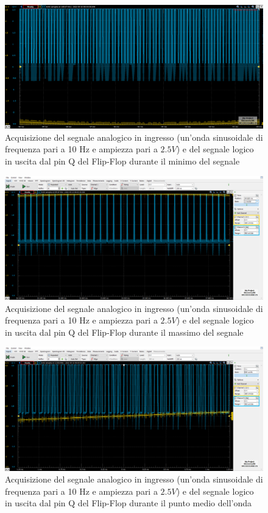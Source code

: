 \documentclass[10pt, a4paper, italian]{article}
\begin{document}
\begin{figure}[htbp]
    \centering
	\includegraphics[width=\textwidth]{BOTTOM}
    \caption{Acquisizione del segnale analogico in ingresso (un'onda sinusoidale di frequenza pari a 10 Hz e ampiezza pari a $2.5 V$) e del segnale logico in uscita dal pin Q del Flip-Flop durante il minimo del segnale}
\end{figure}
\begin{figure}[htbp]
    \centering
	\includegraphics[width=\textwidth]{TOP}
    \caption{Acquisizione del segnale analogico in ingresso (un'onda sinusoidale di frequenza pari a 10 Hz e ampiezza pari a $2.5 V$) e del segnale logico in uscita dal pin Q del Flip-Flop durante il massimo del segnale}
\end{figure}
\begin{figure}[htbp]
    \centering
	\includegraphics[width=\textwidth]{MIDDLE}
    \caption{Acquisizione del segnale analogico in ingresso (un'onda sinusoidale di frequenza pari a 10 Hz e ampiezza pari a $2.5 V$) e del segnale logico in uscita dal pin Q del Flip-Flop durante il punto medio dell'onda}
\end{figure}
\end{document}
